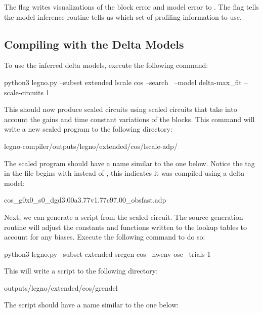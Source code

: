 The  flag writes visualizations of the block
error and model error to . The  flag
tells the model inference routine tells us which set of profiling information to
use.

\subsection{Compiling with the Delta Models}

\noindent To use the inferred delta models, execute the following command:
 
\begin{snippet}
  python3 legno.py --subset extended lscale cos --search \
     --model delta-max_fit --scale-circuits 1
\end{snippet}

\noindent This should now produce scaled circuits using scaled circuits that take into
account the gains and time constant variations of the blocks. This command will
write a new scaled program to the following directory:

\begin{snippet}
  legno-compiler/outputs/legno/extended/cos/lscale-adp/
\end{snippet}

\noindent The scaled program should have a name similar to the one below. Notice
the tag in the file begins with \tx{d} instead of \tx{n}, this indicates it was compiled using a delta model:

\begin{snippet}
  cos_g0x0_s0_dgd3.00a3.77v1.77c97.00_obsfast.adp
\end{snippet}

\noindent Next, we can generate a \grendel script from the scaled circuit. The
source generation routine will adjust the constants and functions written to
the lookup tables to account for any biases. Execute the following command to do so:

\begin{snippet}
  python3 legno.py --subset extended srcgen cos --hwenv osc --trials 1
\end{snippet}

\noindent This will write a \grendel script to the following directory:

\begin{snippet}
  outputs/legno/extended/cos/grendel
\end{snippet}

\noindent The \grendel script should have a name similar to the one below:

